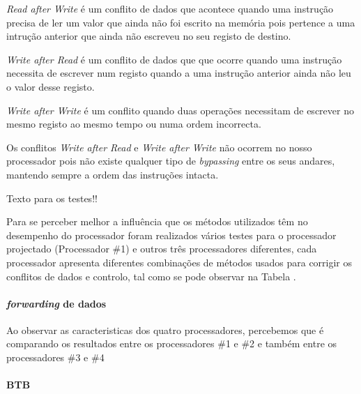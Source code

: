 \textit{Read after Write} é um conflito de dados que acontece quando uma instrução precisa de ler um valor que ainda não foi escrito na memória pois pertence a uma intrução anterior que ainda não escreveu no seu registo de destino.

\textit{Write after Read} é um conflito de dados que que ocorre quando uma instrução necessita de escrever num registo quando a uma instrução anterior ainda não leu o valor desse registo.

\textit{Write after Write} é um conflito quando duas operações necessitam de escrever no mesmo registo ao mesmo tempo ou numa ordem incorrecta.

Os conflitos \textit{Write after Read} e \textit{Write after Write} não ocorrem no nosso processador pois não existe qualquer tipo de \textit{bypassing} entre os seus andares, mantendo sempre a ordem das instruções intacta. 



Texto para os testes!!

Para se perceber melhor a influência que os métodos utilizados têm no desempenho do processador foram realizados vários testes para o processador projectado (Processador \#1) e outros três processadores diferentes, cada processador apresenta diferentes combinações de métodos usados para corrigir os conflitos de dados e controlo, tal como se pode observar na Tabela .

\paragraph{\textit{forwarding} de dados}
Ao observar as caracteristicas dos quatro processadores, percebemos que é comparando os resultados entre os processadores \#1 e \#2 e também entre os processadores \#3 e \#4


\paragraph{BTB}